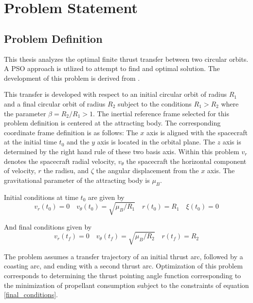 \chapter{Problem Statement}

\section{Problem Definition}

This thesis analyzes the optimal finite thrust transfer between two circular orbits. A PSO approach is utlized to attempt
to find and optimal solution. The development of this problem is derived from \citep{Pontani_Conway}. \newline

This transfer is developed with respect to an initial circular orbit of radius $R_1$ and a final circular orbit of radius $R_2$ subject to the conditions $R_1 > R_2$ where the parameter $\beta = R_2/R_1 > 1$. 
The inertial reference frame selected for this problem definition is centered at the attracting body. The corresponding coordinate frame definition is as follows: The $x$ axis is aligned with the spacecraft at the initial time $t_0$ and the $y$ axis is located in the orbital plane.
The $z$ axis is determined by the right hand rule of these two basis axis. Within this problem $v_r$ denotes the spacecraft radial velocity, $v_\theta$ the spacecraft the horizontal component of velocity, $r$ the radisu, and $\zeta$ the angular displacement from the $x$ axis. The gravitational
parameter of the attracting body is $\mu_B$. \newline

\noindent Initial conditions at time $t_0$ are given by
\begin{equation}
v_r(t_0) = 0  \quad  v_\theta(t_0) = \sqrt{\mu_B/R_1} \quad r(t_0) = R_1 \quad \xi(t_0) = 0
\label{initial_conditions}
\end{equation}

\noindent And final conditions given by
\begin{equation}
    v_r(t_f) = 0 \quad v_\theta(t_f) = \sqrt{\mu_B/R_2} \quad r(t_f) = R_2
    \label{final_conditions}
\end{equation}

The problem assumes a transfer trajectory of an initial thrust arc, followed by a coasting arc, and ending with a second thrust arc. 
Optimization of this problem corresponds to determining the thrust pointing angle function corresponding to the minimization of propellant consumption 
subject to the constraints of equation \ref{final_conditions}.\newline

